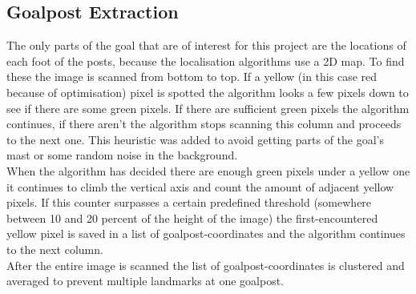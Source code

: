 \documentclass{ba-kecs}
\numberwithin{figure}{section}
\numberwithin{equation}{section}
\begin{document}
\subsection{Goalpost Extraction}
The only parts of the goal that are of interest for this project are the locations of each foot of the posts, because the localisation algorithms use a 2D map. To find these the image is scanned from bottom to top. If a yellow (in this case red because of optimisation) pixel is spotted the algorithm looks a few pixels down to see if there are some green pixels. If there are sufficient green pixels the algorithm continues, if there aren't the algorithm stops scanning this column and proceeds to the next one. This heuristic was added to avoid getting parts of the goal's mast or some random noise in the background.\\
When the algorithm has decided there are enough green pixels under a yellow one it continues to climb the vertical axis and count the amount of adjacent yellow pixels. If this counter surpasses a certain predefined threshold (somewhere between 10 and 20 percent of the height of the image) the first-encountered yellow pixel is saved in a list of goalpost-coordinates and the algorithm continues to the next column.\\
After the entire image is scanned the list of goalpost-coordinates is clustered and averaged to prevent multiple landmarks at one goalpost.
\end{document}
